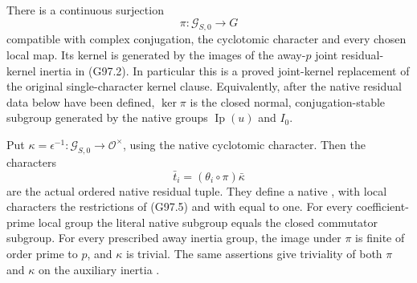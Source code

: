 \begin{proposition}
\label{AC-G97-link}
There is a continuous surjection
\[
 \pi:\mathcal G_{S,0}\longrightarrow G
 \tag{G97.4}
\]
compatible with complex conjugation, the cyclotomic character
and every chosen local map.  Its kernel is generated by the
images of the away-\(p\) joint residual-kernel inertia in
(G97.2).  In particular this is a proved joint-kernel
replacement of the original single-character kernel clause.
Equivalently, after the native residual data below have been
defined, \(\ker\pi\) is the closed normal, conjugation-stable
subgroup generated by the native groups \(\operatorname{Ip}(u)\)
and \(I_0\).

Put \(\kappa=\epsilon^{-1}:\mathcal G_{S,0}\to\mathcal O^\times\),
using the native cyclotomic character.  Then the characters
\[
 \bar t_i=(\theta_i\circ\pi)\bar\kappa
 \tag{G97.5}
\]
are the actual ordered native residual tuple.  They define
a native , with local characters the restrictions
of (G97.5) and with  equal to one.
For every coefficient-prime local group the literal native
subgroup  equals the closed commutator subgroup.
For every prescribed away inertia group, the image under
\(\pi\) is finite of order prime to \(p\), and \(\kappa\)
is trivial.  The same assertions give triviality of both
\(\pi\) and \(\kappa\) on the auxiliary inertia .
\end{proposition}

